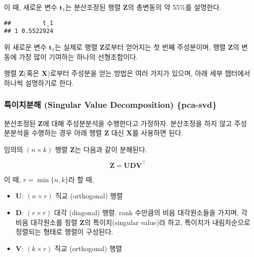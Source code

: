\documentclass[]{book}
\newenvironment{Shaded}{\begin{snugshade}}{\end{snugshade}}
\newcommand{\ControlFlowTok}[1]{\textcolor[rgb]{0.13,0.29,0.53}{\textbf{#1}}}
\newcommand{\DecValTok}[1]{\textcolor[rgb]{0.00,0.00,0.81}{#1}}
\newcommand{\KeywordTok}[1]{\textcolor[rgb]{0.13,0.29,0.53}{\textbf{#1}}}
\newcommand{\NormalTok}[1]{#1}
\newcommand{\OperatorTok}[1]{\textcolor[rgb]{0.81,0.36,0.00}{\textbf{#1}}}
\newcommand{\StringTok}[1]{\textcolor[rgb]{0.31,0.60,0.02}{#1}}
\providecommand{\tightlist}{%
  \setlength{\itemsep}{0pt}\setlength{\parskip}{0pt}}
\begin{document}
이 때, 새로운 변수 \(\mathbf{t}_1\)는 분산조정된 행렬 \(\mathbf{Z}\)의 총변동의 약 55\%를 설명한다.

\begin{Shaded}
\end{Shaded}

\begin{verbatim}
##         t_1
## 1 0.5522924
\end{verbatim}

위 새로운 변수 \(\mathbf{t}_1\)는 실제로 행렬 \(\mathbf{Z}\)로부터 얻어지는 첫 번째 주성분이며, 행렬 \(\mathbf{Z}\)의 변동에 가장 많이 기여하는 하나의 선형조합이다.

행렬 \(\mathbf{Z}\)(혹은 \(\mathbf{X}\))로부터 주성분을 얻는 방법은 여러 가지가 있으며, 아래 세부 챕터에서 하나씩 설명하기로 한다.

\hypertarget{-singular-value-decomposition-pca-svd}{%
\subsubsection{특이치분해 (Singular Value Decomposition) \{pca-svd\}}\label{-singular-value-decomposition-pca-svd}}

분산조정된 \(\mathbf{Z}\)에 대해 주성분분석을 수행한다고 가정하자. 분산조정을 하지 않고 주성분분석을 수행하는 경우 아래 행렬 \(\mathbf{Z}\) 대신 \(\mathbf{X}\)를 사용하면 된다.

임의의 \((n \times k)\) 행렬 \(\mathbf{Z}\)는 다음과 같이 분해된다.

\begin{equation}
\mathbf{Z} = \mathbf{U} \mathbf{D} \mathbf{V}^\top \label{eq:pca-svd}
\end{equation}

이 때, \(r = \min\{n, k\}\)라 할 때,

\begin{itemize}
\tightlist
\item
  \(\mathbf{U}\): \((n \times r)\) 직교 (orthogonal) 행렬
\item
  \(\mathbf{D}\): \((r \times r)\) 대각 (diagonal) 행렬. rank 수만큼의 비음 대각원소들을 가지며, 각 비음 대각원소를 힝렬 \(\mathbf{Z}\)의 특이치(singular value)라 하고, 특이치가 내림차순으로 정렬되는 형태로 행렬이 구성된다.
\item
  \(\mathbf{V}\): \((k \times r)\) 직교 (orthogonal) 행렬
\end{itemize}
\end{document}
